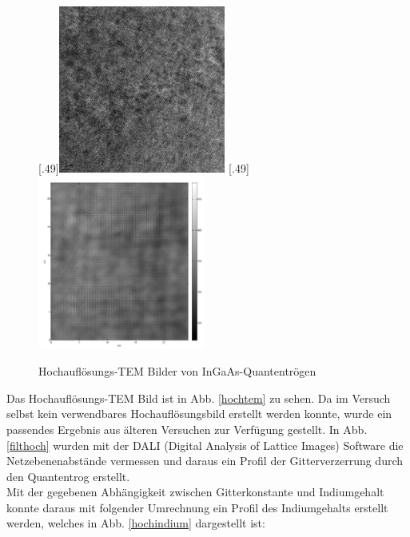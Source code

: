 \documentclass[a4paper,11pt,DIV=11]{scrartcl}
\begin{document}
\begin{figure}[htb]\centering
	[.49\linewidth]{\includegraphics[width=0.49\textwidth]{Versuchsdaten/13/good_data/Frame3.jpg}}
	[.49\linewidth]{\includegraphics[width=0.49\textwidth]{Versuchsdaten/13/good_data/Frame3_rotated_and_filtered.jpg}}\\
	\caption{Hochauflösungs-TEM Bilder von InGaAs-Quantentrögen} \label{hoch}
\end{figure}

Das Hochauflösungs-TEM Bild ist in Abb. \ref{hochtem} zu sehen. Da im Versuch selbst kein verwendbares Hochauflösungsbild erstellt werden konnte, wurde ein passendes Ergebnis aus älteren Versuchen zur Verfügung gestellt. In Abb. \ref{filthoch} wurden mit der DALI (Digital Analysis of Lattice Images) Software die Netzebenenabstände vermessen und daraus ein Profil der Gitterverzerrung durch den Quantentrog erstellt. \\
Mit der gegebenen Abhängigkeit zwischen Gitterkonstante und Indiumgehalt konnte daraus mit folgender Umrechnung ein Profil des Indiumgehalts erstellt werden, welches in Abb. \ref{hochindium} dargestellt ist:
\end{document}
